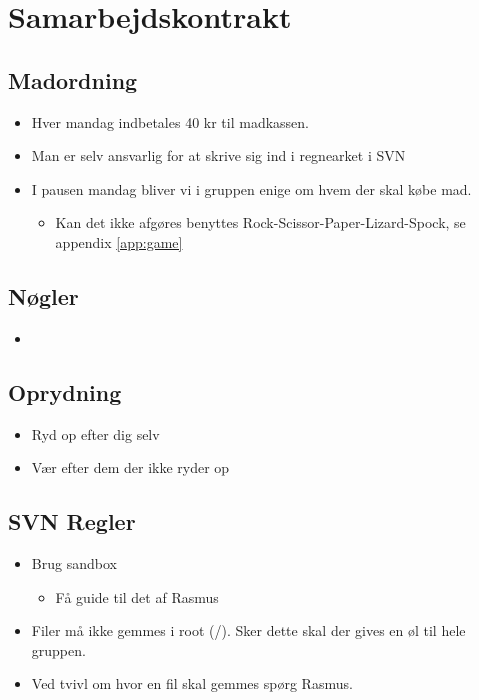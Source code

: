 \documentclass{article}
\begin{document}
\section{Samarbejdskontrakt}
\subsection{Madordning}
\begin{itemize}
	\item Hver mandag indbetales 40 kr til madkassen.
	\item Man er selv ansvarlig for at skrive sig ind i regnearket i SVN
	\item I pausen mandag bliver vi i gruppen enige om hvem der skal k\o{}be mad.
	
	\begin{itemize}
		\item Kan det ikke afg\o{}res benyttes Rock-Scissor-Paper-Lizard-Spock, se appendix \ref{app:game}
	\end{itemize}
\end{itemize}

\subsection{N\o{}gler}
\begin{itemize}
	\item 
\end{itemize}

\subsection{Oprydning}
\begin{itemize}
	\item Ryd op efter dig selv
	\item Vær efter dem der ikke ryder op
\end{itemize}

\subsection{SVN Regler}
\begin{itemize}
	\item Brug sandbox
	\begin{itemize}
		\item Få guide til det af Rasmus
	\end{itemize}
	\item Filer m\aa{} ikke gemmes i root (/). Sker dette skal der gives en \o{}l til hele gruppen.
	\item Ved tvivl om hvor en fil skal gemmes sp\o{}rg Rasmus.
\end{itemize}
\end{document}
